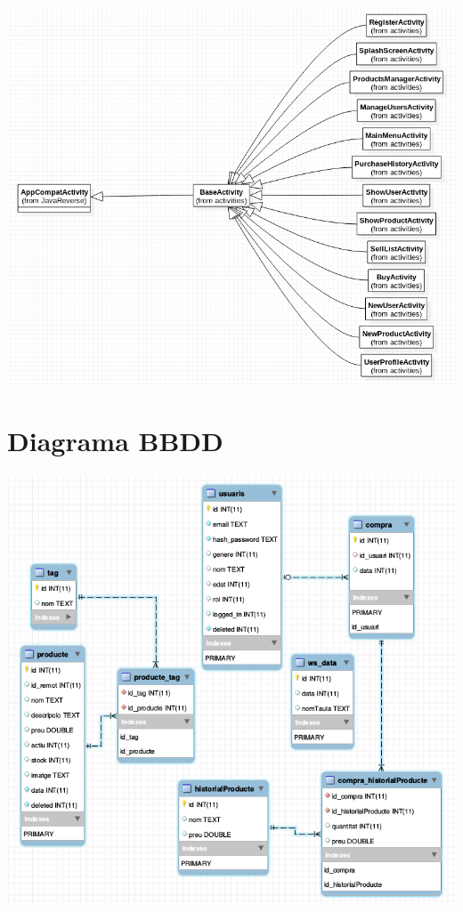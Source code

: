 \documentclass{article}
\begin{document}
\begin{center}
	\includegraphics[scale=0.5]{img/7.png}
\end{center}

\newpage
\section{Diagrama BBDD}
\begin{center}
	\includegraphics[scale=0.5]{img/Android_DB_Schema.png}
\end{center}
\end{document}
